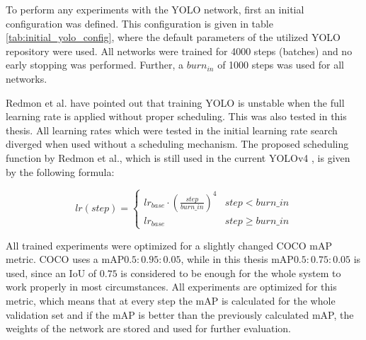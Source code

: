 To perform any experiments with the \ac{YOLO} network, first an initial configuration was defined.
This configuration is given in table \ref{tab:initial_yolo_config}, where the default parameters of the utilized \ac{YOLO} repository were used.
All networks were trained for 4000 steps (batches) and no early stopping was performed.
Further, a $burn_{in}$ of 1000 steps was used for all networks.


Redmon et al. \cite{yolov2} have pointed out that training \ac{YOLO} is unstable when the full learning rate is applied without proper scheduling.
This was also tested in this thesis.
All learning rates which were tested in the initial learning rate search diverged when used without a scheduling mechanism.
The proposed scheduling function by Redmon et al., which is still used in the current \ac{YOLOv4} \cite{yolov4}, is given by the following formula:

\begin{equation}
    lr(step) =
    \begin{cases}
        lr_{base} \cdot (\frac{step}{burn\_in})^4 & step < burn\_in\\
        lr_{base}                             & step \geq burn\_in
    \end{cases}
\end{equation}

All trained experiments were optimized for a slightly changed COCO mAP metric.
COCO uses a $\text{mAP}0.5:0.95:0.05$, while in this thesis $\text{mAP}0.5:0.75:0.05$ is used, since an \ac{IoU} of $0.75$ is considered to be enough for the whole system to work properly in most circumstances.
All experiments are optimized for this metric, which means that at every step the mAP is calculated for the whole validation set and if the mAP is better than the previously calculated mAP, the weights of the network are stored and used for further evaluation.







